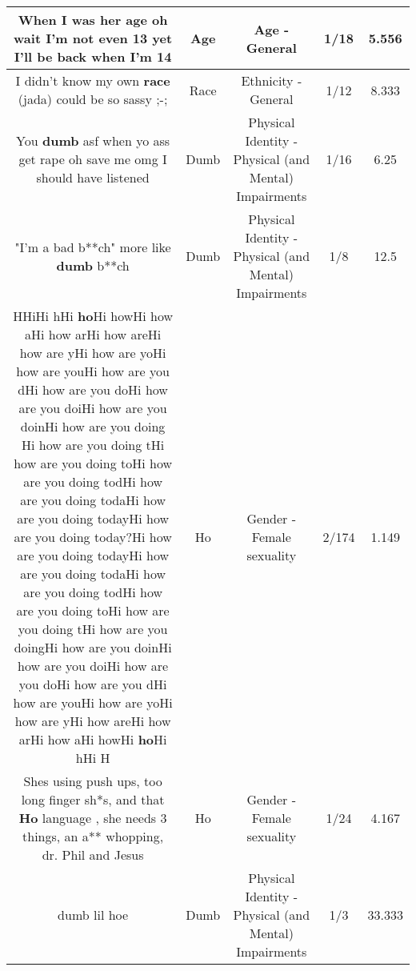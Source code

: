 \documentclass[11pt]{article}
\newlength\mylength
\begin{document}
\begin{center}
\begin{longtable}{|C{.65\mylength}|C{.30\mylength}|C{.12\mylength}|C{.12\mylength}|C{.12\mylength}|}
  \small When I was her \textbf{age} oh wait I'm not even 13 yet I'll be back when I'm 14\normalsize   & Age & Age - General & 1/18 & 5.556 \\  \hline
  \small I didn't know my own \textbf{race} (jada) could be so sassy ;-;\normalsize   & Race & Ethnicity - General & 1/12 & 8.333 \\  \hline
  \small You \textbf{dumb} asf when yo ass get rape oh save me omg I should have listened\normalsize   & Dumb & Physical Identity - Physical (and Mental) Impairments & 1/16 & 6.25 \\  \hline
  \small "I'm a bad b**ch" more like \textbf{dumb} b**ch\normalsize   & Dumb & Physical Identity - Physical (and Mental) Impairments & 1/8 & 12.5 \\  \hline
  \small HHiHi hHi \textbf{ho}Hi howHi how aHi how arHi how areHi how are yHi how are yoHi how are youHi how are you dHi how are you doHi how are you doiHi how are you doinHi how are you doing Hi how are you doing tHi how are you doing toHi how are you doing todHi how are you doing todaHi how are you doing todayHi how are you doing today?Hi how are you doing todayHi how are you doing todaHi how are you doing todHi how are you doing toHi how are you doing tHi how are you doingHi how are you doinHi how are you doiHi how are you doHi how are you dHi how are youHi how are yoHi how are yHi how areHi how arHi how aHi howHi \textbf{ho}Hi hHi H\normalsize   & Ho & Gender - Female sexuality & 2/174 & 1.149 \\  \hline
  \small Shes using push ups, too long finger sh*s, and that \textbf{Ho} language , she needs 3 things, an a** whopping, dr. Phil and Jesus\normalsize   & Ho & Gender - Female sexuality & 1/24 & 4.167 \\  \hline
  \small dumb lil hoe\normalsize   & Dumb & Physical Identity - Physical (and Mental) Impairments & 1/3 & 33.333 \\  \hline

\end{longtable}
\end{center}
\end{document}

